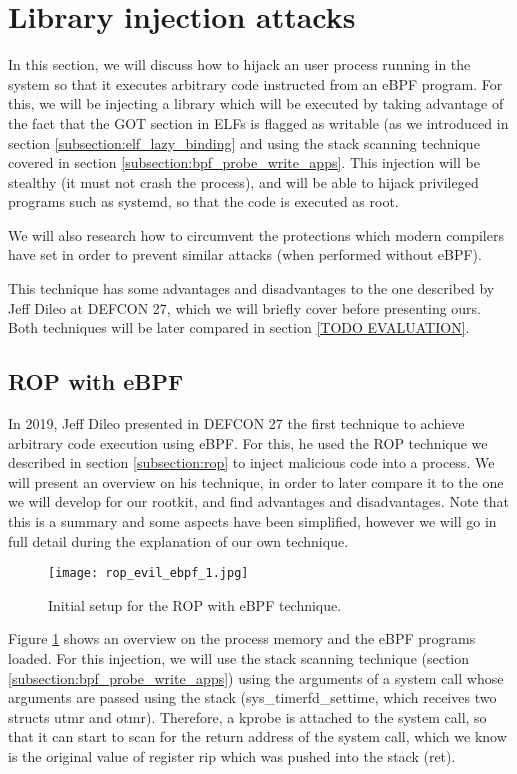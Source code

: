 \section{Library injection attacks}
In this section, we will discuss how to hijack an user process running in the system so that it executes arbitrary code instructed from an eBPF program. For this, we will be injecting a library which will be executed by taking advantage of the fact that the GOT section in ELFs is flagged as writable (as we introduced in section \ref{subsection:elf_lazy_binding} and using the stack scanning technique covered in section \ref{subsection:bpf_probe_write_apps}. This injection will be stealthy (it must not crash the process), and will be able to hijack privileged programs such as systemd, so that the code is executed as root.

We will also research how to circumvent the protections which modern compilers have set in order to prevent similar attacks (when performed without eBPF).

This technique has some advantages and disadvantages to the one described by Jeff Dileo at DEFCON 27\cite{evil_ebpf_p6974}, which we will briefly cover before presenting ours. Both techniques will be later compared in section \ref{TODO EVALUATION}.


\subsection{ROP with eBPF} \label{subsection:rop_ebpf}
In 2019, Jeff Dileo presented in DEFCON 27 the first technique to achieve arbitrary code execution using eBPF\cite{evil_ebpf_p6974}. For this, he used the ROP technique we described in section \ref{subsection:rop} to inject malicious code into a process. We will present an overview on his technique, in order to later compare it to the one we will develop for our rootkit, and find advantages and disadvantages. Note that this is a summary and some aspects have been simplified, however we will go in full detail during the explanation of our own technique.

\begin{figure}[H]
	\centering
	\texttt{[image: rop\_evil\_ebpf\_1.jpg]}
	\caption{Initial setup for the ROP with eBPF technique.}
	\label{fig:rop_evil_ebpf_1}
\end{figure}

Figure \ref{fig:rop_evil_ebpf_1} shows an overview on the process memory and the eBPF programs loaded. For this injection, we will use the stack scanning technique (section \ref{subsection:bpf_probe_write_apps}) using the arguments of a system call whose arguments are passed using the stack (sys\_timerfd\_settime, which receives two structs utmr and otmr). Therefore, a kprobe is attached to the system call, so that it can start to scan for the return address of the system call, which we know is the original value of register rip which was pushed into the stack (ret).

